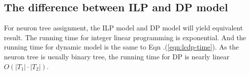 \subsection{The difference between ILP and DP model}
For neuron tree assignment, the ILP model and DP model will yield equivalent result. The running time for integer linear programming is exponential. And the running time for dynamic model is the same to Eqn .(\ref{eqn:lcdp-time}). As the neuron tree is usually binary tree, the running time for DP is nearly linear $O(|T_1|\cdot|T_2|)$.
